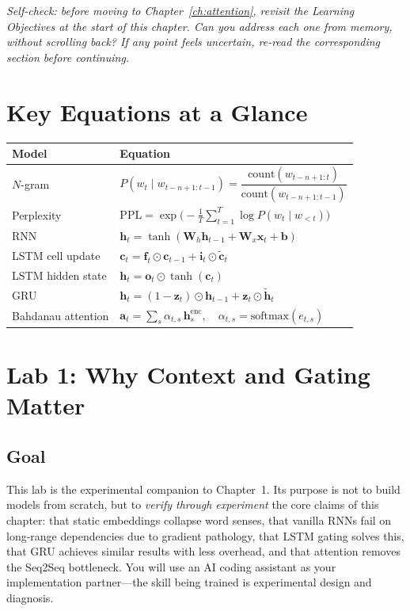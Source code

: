 \medskip
\noindent\textit{Self-check: before moving to Chapter~\ref{ch:attention}, revisit the Learning Objectives at the start of this chapter. Can you address each one from memory, without scrolling back? If any point feels uncertain, re-read the corresponding section before continuing.}

\section*{Key Equations at a Glance}

\begin{center}
\renewcommand{\arraystretch}{1.6}
\begin{tabular}{lp{}}
\toprule
Model & Equation \\
\midrule
$N$-gram & $P(w_t \mid w_{t-n+1:t-1}) = \dfrac{\text{count}(w_{t-n+1:t})}{\text{count}(w_{t-n+1:t-1})}$ \\[4pt]
Perplexity & $\text{PPL} = \exp\!\bigl(-\tfrac{1}{T}\sum_{t=1}^T \log P(w_t \mid w_{<t})\bigr)$ \\[4pt]
RNN & $\mathbf{h}_t = \tanh(\mathbf{W}_h \mathbf{h}_{t-1} + \mathbf{W}_x \mathbf{x}_t + \mathbf{b})$ \\[4pt]
LSTM cell update & $\mathbf{c}_t = \mathbf{f}_t \odot \mathbf{c}_{t-1} + \mathbf{i}_t \odot \tilde{\mathbf{c}}_t$ \\[4pt]
LSTM hidden state & $\mathbf{h}_t = \mathbf{o}_t \odot \tanh(\mathbf{c}_t)$ \\[4pt]
GRU & $\mathbf{h}_t = (1-\mathbf{z}_t)\odot \mathbf{h}_{t-1} + \mathbf{z}_t \odot \tilde{\mathbf{h}}_t$ \\[4pt]
Bahdanau attention & $\mathbf{a}_t = \sum_s \alpha_{t,s}\,\mathbf{h}_s^{\text{enc}}, \quad \alpha_{t,s} = \text{softmax}(e_{t,s})$ \\
\bottomrule
\end{tabular}
\end{center}

\section*{Lab 1: Why Context and Gating Matter}

\subsection*{Goal}

This lab is the experimental companion to Chapter~1. Its purpose is not to build models from scratch, but to \emph{verify through experiment} the core claims of this chapter: that static embeddings collapse word senses, that vanilla RNNs fail on long-range dependencies due to gradient pathology, that LSTM gating solves this, that GRU achieves similar results with less overhead, and that attention removes the Seq2Seq bottleneck. You will use an AI coding assistant as your implementation partner---the skill being trained is experimental design and diagnosis.

